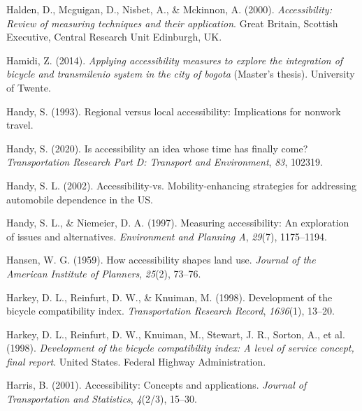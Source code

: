 \documentclass[
11pt, %
oneside, %
english, %
singlespacing, %
]{macthesis} %
\newlength{\cslhangindent}
\newenvironment{CSLReferences}[2] %
 {%
  \setlength{\parindent}{0pt}
  \ifodd #1 \everypar{\setlength{\hangindent}{\cslhangindent}}\ignorespaces\fi
  \ifnum #2 > 0
  \setlength{\parskip}{#2\baselineskip}
  \fi
 }%
 {}
\begin{document}
\begin{CSLReferences}{1}{0}
\leavevmode{}%
Halden, D., Mcguigan, D., Nisbet, A., \& Mckinnon, A. (2000). \emph{Accessibility: Review of measuring techniques and their application}. Great Britain, Scottish Executive, Central Research Unit Edinburgh, UK.

\leavevmode{}%
Hamidi, Z. (2014). \emph{Applying accessibility measures to explore the integration of bicycle and transmilenio system in the city of bogota} (Master's thesis). University of Twente.

\leavevmode{}%
Handy, S. (1993). Regional versus local accessibility: Implications for nonwork travel.

\leavevmode{}%
Handy, S. (2020). Is accessibility an idea whose time has finally come? \emph{Transportation Research Part D: Transport and Environment}, \emph{83}, 102319.

\leavevmode{}%
Handy, S. L. (2002). Accessibility-vs. Mobility-enhancing strategies for addressing automobile dependence in the US.

\leavevmode{}%
Handy, S. L., \& Niemeier, D. A. (1997). Measuring accessibility: An exploration of issues and alternatives. \emph{Environment and Planning A}, \emph{29}(7), 1175--1194.

\leavevmode{}%
Hansen, W. G. (1959). How accessibility shapes land use. \emph{Journal of the American Institute of Planners}, \emph{25}(2), 73--76.

\leavevmode{}%
Harkey, D. L., Reinfurt, D. W., \& Knuiman, M. (1998). Development of the bicycle compatibility index. \emph{Transportation Research Record}, \emph{1636}(1), 13--20.

\leavevmode{}%
Harkey, D. L., Reinfurt, D. W., Knuiman, M., Stewart, J. R., Sorton, A., et al. (1998). \emph{Development of the bicycle compatibility index: A level of service concept, final report}. United States. Federal Highway Administration.

\leavevmode{}%
Harris, B. (2001). Accessibility: Concepts and applications. \emph{Journal of Transportation and Statistics}, \emph{4}(2/3), 15--30.


\end{CSLReferences}
\end{document}
